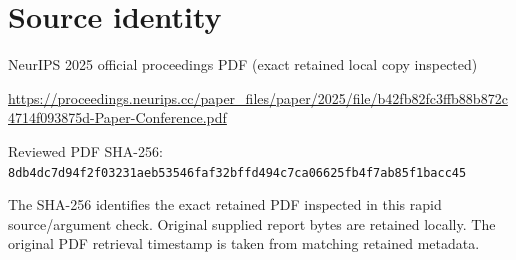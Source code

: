 \documentclass[11pt]{article}
\begin{document}
\section*{Source identity}

NeurIPS 2025 official proceedings PDF (exact retained local copy inspected)

\url{https://proceedings.neurips.cc/paper_files/paper/2025/file/b42fb82fc3ffb88b872c4714f093875d-Paper-Conference.pdf}

Reviewed PDF SHA-256: \nolinkurl{8db4dc7d94f2f03231aeb53546faf32bffd494c7ca06625fb4f7ab85f1bacc45}

The SHA-256 identifies the exact retained PDF inspected in this rapid source/argument check. Original supplied report bytes are retained locally. The original PDF retrieval timestamp is taken from matching retained metadata.
\end{document}
